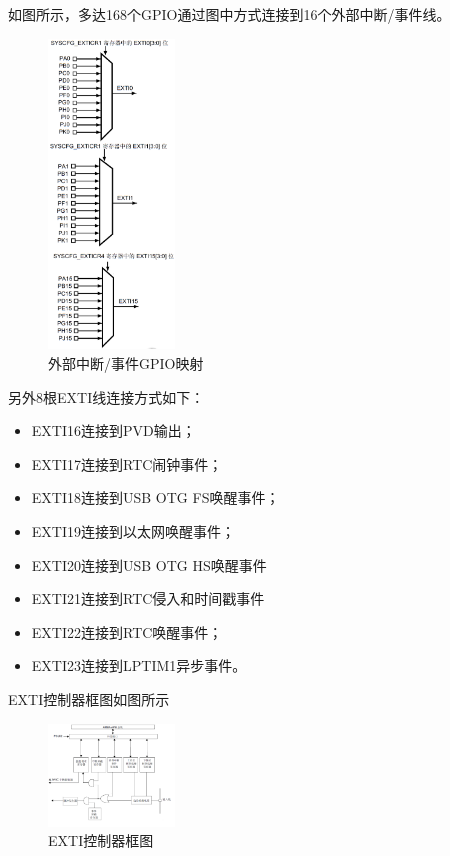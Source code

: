﻿\documentclass[UTF8,12pt]{article}
\begin{document}
\begin{enumerate}
  如图所示，多达168个GPIO通过图中方式连接到16个外部中断/事件线。
  \begin{figure}[htbp]
    \centering
    \includegraphics[width=0.3\textwidth]{imgs/3.png}
    \caption{外部中断/事件GPIO映射}
  \end{figure}
  另外8根EXTI线连接方式如下：
  \begin{itemize}
    \item EXTI16连接到PVD输出；
    \item EXTI17连接到RTC闹钟事件；
    \item EXTI18连接到USB OTG FS唤醒事件；
    \item EXTI19连接到以太网唤醒事件；
    \item EXTI20连接到USB OTG HS唤醒事件
    \item EXTI21连接到RTC侵入和时间戳事件
    \item EXTI22连接到RTC唤醒事件；
    \item EXTI23连接到LPTIM1异步事件。
  \end{itemize}
  EXTI控制器框图如图所示
  \begin{figure}[htbp]
    \centering
    \includegraphics[width=0.3\textwidth]{imgs/4.png}
    \caption{EXTI控制器框图}
  \end{figure}


\end{enumerate}
\end{document}
